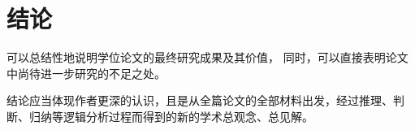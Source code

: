\section*{结论}
可以总结性地说明学位论文的最终研究成果及其价值，
同时，可以直接表明论文中尚待进一步研究的不足之处。

结论应当体现作者更深的认识，且是从全篇论文的全部材料出发，经过推理、判断、归纳等逻辑分析过程而得到的新的学术总观念、总见解。
 \pagebreak